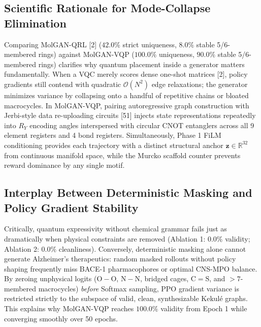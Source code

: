\documentclass[10pt,a4paper]{article}
\begin{document}
\subsection{Scientific Rationale for Mode-Collapse Elimination}
Comparing MolGAN-QRL [2] ($42.0\%$ strict uniqueness, $8.0\%$ stable 5/6-membered rings) against MolGAN-VQP ($100.0\%$ uniqueness, $90.0\%$ stable 5/6-membered rings) clarifies why quantum placement inside a generator matters fundamentally. When a VQC merely scores dense one-shot matrices [2], policy gradients still contend with quadratic $\mathcal{O}(N^2)$ edge relaxations; the generator minimizes variance by collapsing onto a handful of repetitive chains or bloated macrocycles. In MolGAN-VQP, pairing autoregressive graph construction with Jerbi-style data re-uploading circuits [51] injects state representations repeatedly into $R_Y$ encoding angles interspersed with circular CNOT entanglers across all 9 element registers and 4 bond registers. Simultaneously, Phase 1 FiLM conditioning provides each trajectory with a distinct structural anchor $\mathbf{z} \in \mathbb{R}^{32}$ from continuous manifold space, while the Murcko scaffold counter prevents reward dominance by any single motif.

\subsection{Interplay Between Deterministic Masking and Policy Gradient Stability}
Critically, quantum expressivity without chemical grammar fails just as dramatically when physical constraints are removed (Ablation 1: $0.0\%$ validity; Ablation 2: $0.0\%$ cleanliness). Conversely, deterministic masking alone cannot generate Alzheimer's therapeutics: random masked rollouts without policy shaping frequently miss BACE-1 pharmacophores or optimal CNS-MPO balance. By zeroing unphysical logits ($\mathrm{O}{-}\mathrm{O}$, $\mathrm{N}{-}\mathrm{N}$, bridged cages, $\mathrm{C}{=}\mathrm{S}$, and $>7$-membered macrocycles) \textit{before} Softmax sampling, PPO gradient variance is restricted strictly to the subspace of valid, clean, synthesizable Kekul\'e graphs. This explains why MolGAN-VQP reaches $100.0\%$ validity from Epoch 1 while converging smoothly over 50 epochs.
\end{document}
